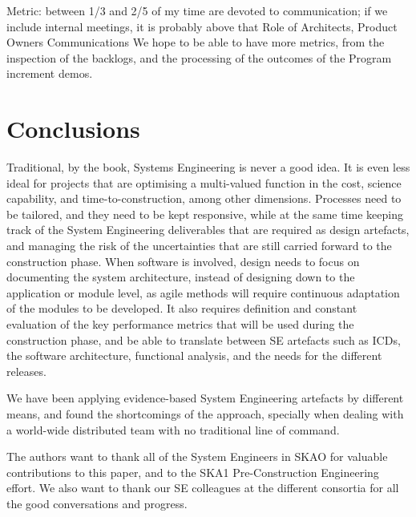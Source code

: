 \documentclass[11pt,twoside]{article}
\begin{document}
	
Metric: between 1/3 and 2/5 of my time are devoted to communication; if we include internal meetings, it is probably above that	
Role of Architects, Product Owners	
Communications	
We hope to be able to have more metrics, from the inspection of the backlogs, and the processing of the outcomes of the Program increment demos.	



\section{Conclusions} %
\label{sec:conclusions}
Traditional, by the book, Systems Engineering is never a good idea. It is even less ideal for projects that are optimising a multi-valued function in the cost, science capability, and time-to-construction, among other dimensions. Processes need to be tailored, and they need to be kept responsive, while at the same time keeping track of the System Engineering deliverables that are required as design artefacts, and managing the risk of the uncertainties that are still carried forward to the construction phase. When software is involved, design needs to focus on documenting the system architecture, instead of designing down to the application or module level, as agile methods will require continuous adaptation of the modules to be developed. It also requires definition and constant evaluation of the key performance metrics that will be used during the construction phase, and be able to translate between SE artefacts such as ICDs, the software architecture, functional analysis, and the needs for the different releases.	

We have been applying evidence-based System Engineering artefacts by different means, and found the shortcomings of the approach, specially when dealing with a world-wide distributed team with no traditional line of command.	


\acknowledgements The authors want to thank all of the System Engineers in SKAO for valuable contributions to this paper, and to the SKA1 Pre-Construction Engineering effort. We also want to thank our SE colleagues at the different consortia for all the good conversations and progress.


\end{document}
